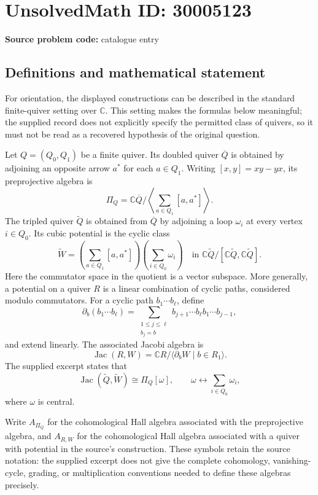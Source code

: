 \documentclass[11pt]{article}
\newcommand{\C}{\mathbb{C}}
\begin{document}
\section*{UnsolvedMath ID: 30005123}
\textbf{Source problem code:} catalogue entry
\subsection{Definitions and mathematical statement}
For orientation, the displayed constructions can be described in the standard finite-quiver setting over \(\C\). This setting makes the formulas below meaningful; the supplied record does not explicitly specify the permitted class of quivers, so it must not be read as a recovered hypothesis of the original question.

Let \(Q=(Q_0,Q_1)\) be a finite quiver. Its doubled quiver \(\overline Q\) is obtained by adjoining an opposite arrow \(a^*\) for each \(a\in Q_1\). Writing \([x,y]=xy-yx\), its preprojective algebra is
\[
\Pi_Q=\C\overline Q\Big/\left\langle\sum_{a\in Q_1}[a,a^*]\right\rangle.
\]
The tripled quiver \(\widetilde Q\) is obtained from \(\overline Q\) by adjoining a loop \(\omega_i\) at every vertex \(i\in Q_0\). Its cubic potential is the cyclic class
\[
\widetilde W=
\left(\sum_{a\in Q_1}[a,a^*]\right)
\left(\sum_{i\in Q_0}\omega_i\right)
\quad\text{in }\C\widetilde Q/[\C\widetilde Q,\C\widetilde Q].
\]
Here the commutator space in the quotient is a vector subspace. More generally, a potential on a quiver \(R\) is a linear combination of cyclic paths, considered modulo commutators. For a cyclic path \(b_1\cdots b_\ell\), define
\[
\partial_b(b_1\cdots b_\ell)
 =\sum_{\substack{1\leq j\leq\ell\\b_j=b}}
 b_{j+1}\cdots b_\ell b_1\cdots b_{j-1},
\]
and extend linearly. The associated Jacobi algebra is
\[
\operatorname{Jac}(R,W)=
\C R/\langle\partial_bW\mid b\in R_1\rangle.
\]
The supplied excerpt states that
\[
\operatorname{Jac}(\widetilde Q,\widetilde W)
\cong\Pi_Q[\omega],
\qquad
\omega\longleftrightarrow\sum_{i\in Q_0}\omega_i,
\]
where \(\omega\) is central.

Write \(A_{\Pi_Q}\) for the cohomological Hall algebra associated with the preprojective algebra, and \(A_{R,W}\) for the cohomological Hall algebra associated with a quiver with potential in the source's construction. These symbols retain the source notation: the supplied excerpt does not give the complete cohomology, vanishing-cycle, grading, or multiplication conventions needed to define these algebras precisely.
\end{document}
